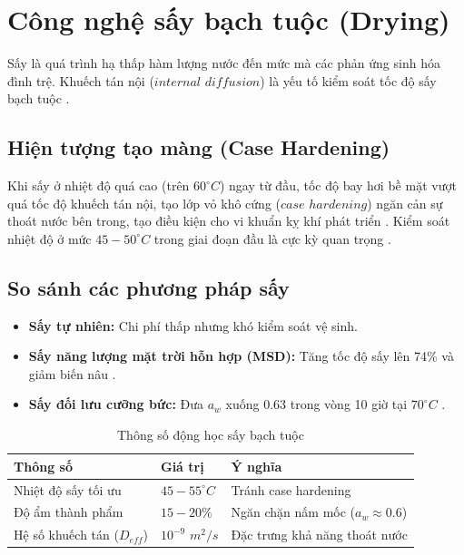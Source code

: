 \documentclass[12pt,a4paper]{report}
\begin{document}
\section{Công nghệ sấy bạch tuộc (Drying)}

Sấy là quá trình hạ thấp hàm lượng nước đến mức mà các phản ứng sinh hóa đình trệ. Khuếch tán nội ($internal$ $diffusion$) là yếu tố kiểm soát tốc độ sấy bạch tuộc \cite{octopus_drying}.

\subsection{Hiện tượng tạo màng (Case Hardening)}

Khi sấy ở nhiệt độ quá cao (trên $60^\circ C$) ngay từ đầu, tốc độ bay hơi bề mặt vượt quá tốc độ khuếch tán nội, tạo lớp vỏ khô cứng ($case$ $hardening$) ngăn cản sự thoát nước bên trong, tạo điều kiện cho vi khuẩn kỵ khí phát triển \cite{case_hardening}. Kiểm soát nhiệt độ ở mức $45-50^\circ C$ trong giai đoạn đầu là cực kỳ quan trọng \cite{vacuum_drying}.

\subsection{So sánh các phương pháp sấy}

\begin{itemize}
	\item \textbf{Sấy tự nhiên:} Chi phí thấp nhưng khó kiểm soát vệ sinh.
	\item \textbf{Sấy năng lượng mặt trời hỗn hợp (MSD):} Tăng tốc độ sấy lên 74\% và giảm biến nâu \cite{octopus_drying}.
	\item \textbf{Sấy đối lưu cưỡng bức:} Đưa $a_w$ xuống 0.63 trong vòng 10 giờ tại $70^\circ C$ \cite{octopus_kinetics}.
\end{itemize}

\begin{table}[H]
	\centering
	\caption{Thông số động học sấy bạch tuộc}
	\begin{tabular}{lll}
		\toprule
		\textbf{Thông số} & \textbf{Giá trị} & \textbf{Ý nghĩa} \\
		\midrule
		Nhiệt độ sấy tối ưu & $45-55^\circ C$ & Tránh case hardening \cite{vacuum_drying} \\
		Độ ẩm thành phẩm & $15-20\%$ & Ngăn chặn nấm mốc ($a_w \approx 0.6$) \cite{fish_preservation} \\
		Hệ số khuếch tán ($D_{eff}$) & $10^{-9}$ $m^2/s$ & Đặc trưng khả năng thoát nước \cite{pressure_drying} \\
		\bottomrule
	\end{tabular}
\end{table}
\end{document}
